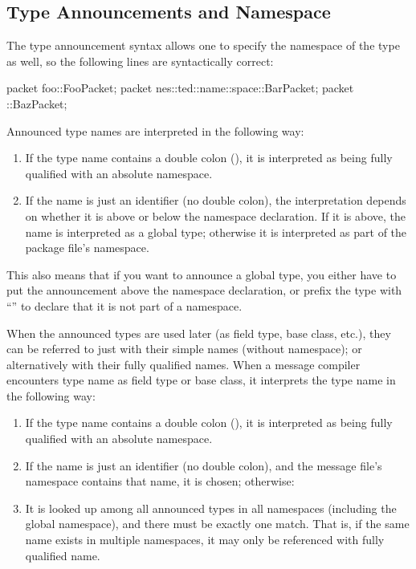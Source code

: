 \subsection{Type Announcements and Namespace}

The type announcement syntax allows one to specify the namespace of the type
as well, so the following lines are syntactically correct:

\begin{msg}
packet foo::FooPacket;
packet nes::ted::name::space::BarPacket;
packet ::BazPacket;
\end{msg}

Announced type names are interpreted in the following way:

\begin{enumerate}
\item If the type name contains a double colon (\ttt{::}), it is interpreted
      as being fully qualified with an absolute namespace.
\item If the name is just an identifier (no double colon), the interpretation
      depends on whether it is above or below the namespace declaration.
      If it is above, the name is interpreted as a global type; otherwise
      it is interpreted as part of the package file's namespace.
\end{enumerate}

This also means that if you want to announce a global type, you either
have to put the announcement above the namespace declaration, or prefix
the type with ``\ttt{::}'' to declare that it is not part of a namespace.

When the announced types are used later (as field type, base class, etc.),
they can be referred to just with their simple names (without namespace);
or alternatively with their fully qualified names. When a message compiler
encounters type name as field type or base class, it interprets the type
name in the following way:

\begin{enumerate}
\item If the type name contains a double colon (\ttt{::}), it is interpreted
      as being fully qualified with an absolute namespace.
\item If the name is just an identifier (no double colon), and the message
      file's namespace contains that name, it is chosen; otherwise:
\item It is looked up among all announced types in all namespaces (including
      the global namespace), and there must be exactly one match. That is,
      if the same name exists in multiple namespaces, it may only be
      referenced with fully qualified name.
\end{enumerate}

